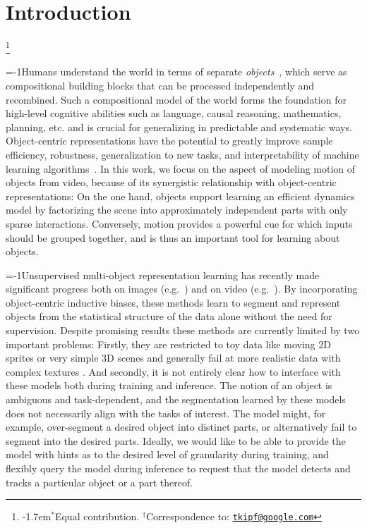 \documentclass{article}
\newcommand\blfootnote[1]{%
  \begingroup
  \renewcommand\thefootnote{}\footnote{#1}%
  \addtocounter{footnote}{-1}%
  \endgroup
}
\begin{document}
\section{Introduction}
\blfootnote{\kern-1.7em$^*$Equal contribution. $^\dagger$Correspondence to: \href{mailto:tkipf@google.com}{\texttt{tkipf@google.com}}}%
\looseness=-1Humans understand the world in terms of separate \emph{objects}~\citep{kahneman1992reviewing,spelke2007core}, which serve as compositional building blocks that can be processed independently and recombined. %
Such a compositional model of the world forms the foundation for high-level cognitive abilities such as language, causal reasoning, mathematics, planning, etc. and is crucial for generalizing in predictable and systematic ways. 
Object-centric representations have the potential to greatly improve sample efficiency, robustness, generalization to new tasks, and interpretability of machine learning algorithms~\citep{greff2020binding}.
In this work, we focus on the aspect of modeling motion of objects from video, because of its synergistic relationship with object-centric representations:
On the one hand, objects support learning an efficient dynamics model by factorizing the scene into approximately independent parts with only sparse interactions.
Conversely, motion provides a powerful cue for which inputs should be grouped together, and is thus an important tool for learning about objects.

\looseness=-1Unsupervised multi-object representation learning has recently made significant progress both on images (e.g.~\citealp{burgess2019monet,greff2019multi,lin2020space,locatello2020object}) and on video (e.g.~\citealp{veerapaneni2020entity,weis2020unmasking,jiang2019scalable}).
By incorporating object-centric inductive biases, these methods learn to segment and represent objects from the statistical structure of the data alone without the need for supervision.
Despite promising results these methods are currently limited by two important problems:
Firstly, they are restricted to toy data like moving 2D sprites or very simple 3D scenes and generally fail at more realistic data with complex textures \citep{greff2019multi,harley2021track,clevrtex2021karazija}.
And secondly, it is not entirely clear how to interface with these models both during training and inference. 
The notion of an object is ambiguous and task-dependent, and the segmentation learned by these models does not necessarily align with the tasks of interest.
The model might, for example, over-segment a desired object into distinct parts, or alternatively fail to segment into the desired parts. 
Ideally, we would like to be able to provide the model with hints as to the desired level of granularity during training, and flexibly query the model during inference to request that the model detects and tracks a particular object or a part thereof. 
\end{document}
